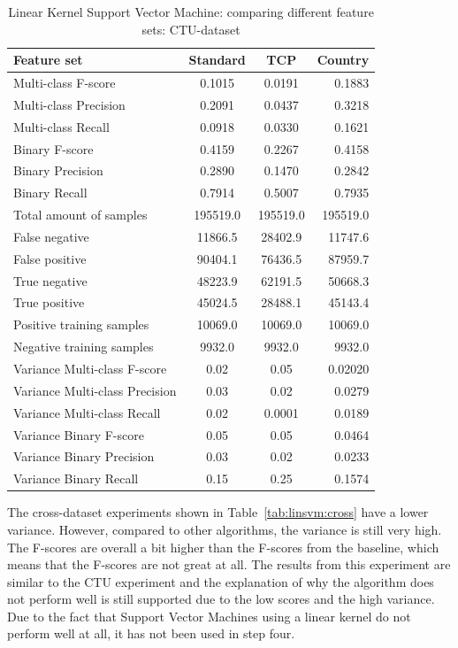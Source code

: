 \begin{table}[H]
\caption{Linear Kernel Support Vector Machine: comparing different feature sets: CTU-dataset}
\label{tab:linsvm:ctu}
\centering
\begin{tabular}{l c c r}
\toprule
Feature set & Standard & TCP & Country \\
\midrule
Multi-class F-score & 0.1015 & 0.0191 & 0.1883 \\
Multi-class Precision & 0.2091 & 0.0437 & 0.3218 \\
Multi-class Recall & 0.0918 & 0.0330 & 0.1621 \\
\midrule
Binary F-score & 0.4159 & 0.2267 & 0.4158 \\
Binary Precision & 0.2890 & 0.1470 & 0.2842 \\
Binary Recall & 0.7914 & 0.5007 & 0.7935 \\
\midrule
Total amount of samples & 195519.0 & 195519.0 & 195519.0 \\
False negative & 11866.5 & 28402.9 & 11747.6 \\
False positive & 90404.1 & 76436.5 & 87959.7 \\
True negative & 48223.9 & 62191.5 & 50668.3 \\
True positive & 45024.5 & 28488.1 & 45143.4 \\
\midrule
Positive training samples & 10069.0 & 10069.0 & 10069.0\\
Negative training samples & 9932.0 & 9932.0 & 9932.0\\
\midrule
Variance Multi-class F-score & 0.02 & 0.05 & 0.02020\\
Variance Multi-class Precision & 0.03 &  0.02 & 0.0279\\
Variance Multi-class Recall &  0.02 & 0.0001 &  0.0189   \\
\midrule
Variance Binary F-score & 0.05 &  0.05  & 0.0464 \\
Variance Binary Precision & 0.03 &  0.02 & 0.0233 \\
Variance Binary Recall & 0.15 & 0.25 & 0.1574 \\
\bottomrule
\end{tabular}
\end{table}

\noindent The cross-dataset experiments shown in Table~\ref{tab:linsvm:cross} have a lower variance. However, compared to other algorithms, the variance is still very high. The F-scores are overall a bit higher than the F-scores from the baseline, which means that the F-scores are not great at all. The results from this experiment are similar to the CTU experiment and the explanation of why the algorithm does not perform well is still supported due to the low scores and the high variance. Due to the fact that Support Vector Machines using a linear kernel do not perform well at all, it has not been used in step four.

